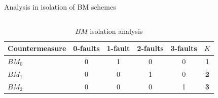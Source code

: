 \begin{frame}[fragile]{Analysis in isolation of BM schemes}
\begin{columns}
\begin{small}
\begin{column}{0.48\textwidth}
                \begin{table}[ht]
                    \begin{tiny}
                        \begin{center}
                            \setlength\tabcolsep{2.1pt} %
                            \begin{tabular}{l|ccccc}
                                Countermeasure & 0-faults & 1-fault & 2-faults & 3-faults  & \textbf{$K$} \\
                                \hline
                                $BM_0$ & 0 & 1 & 0 & 0 & \textbf{1}\\
                                $BM_1$ & 0 & 0 & 1 & 0 & \textbf{2} \\
                                $BM_2$ & 0 & 0 & 0 & 1 & \textbf{3}
                            \end{tabular}
                        \end{center}                         
                    \end{tiny}
                    \caption{$BM$ isolation analysis}
                \end{table}
            \end{column}
        \end{small}
    \end{columns}
\end{frame}

